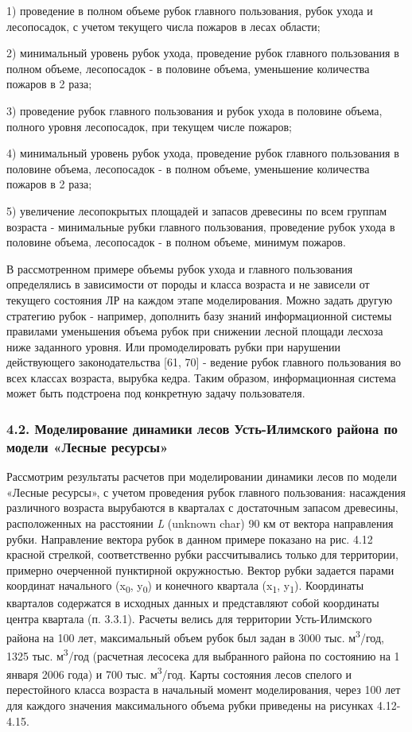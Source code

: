 \documentclass{article}
\begin{document}
1) проведение в полном объеме рубок главного 
пользования, рубок ухода и лесопосадок, с учетом 
текущего числа пожаров в лесах области; 

2) минимальный уровень рубок ухода, проведение 
рубок главного пользования в полном объеме, 
лесопосадок - в половине объема, уменьшение 
количества пожаров в 2 раза; 

3) проведение рубок главного пользования и рубок 
ухода в половине объема, полного уровня лесопосадок, 
при текущем числе пожаров; 

4) минимальный уровень рубок ухода, проведение 
рубок главного пользования в половине объема, 
лесопосадок - в полном объеме, уменьшение количества 
пожаров в 2 раза; 

5) увеличение лесопокрытых площадей и запасов 
древесины по всем группам возраста - минимальные 
рубки главного пользования, проведение рубок 
ухода в половине объема, лесопосадок - в полном 
объеме, минимум пожаров.

В рассмотренном примере объемы рубок ухода 
и главного пользования определялись в зависимости 
от породы и класса возраста и не зависели от 
текущего состояния ЛР на каждом этапе моделирования. 
Можно задать другую стратегию рубок - например, 
дополнить базу знаний информационной системы 
правилами уменьшения объема рубок при снижении 
лесной площади лесхоза ниже заданного уровня. 
Или промоделировать рубки при нарушении действующего 
законодательства [61, 70] - ведение рубок главного 
пользования во всех классах возраста, вырубка 
кедра. Таким образом, информационная система 
может быть подстроена под конкретную задачу 
пользователя.\label{HToc199746742}

\subsubsection*{\textbf{4.2. Моделирование динамики лесов 
Усть-Илимского района по модели «Лесные ресурсы»}}

Рассмотрим результаты расчетов при моделировании 
динамики лесов по модели «Лесные ресурсы», 
с учетом проведения рубок главного пользования: 
насаждения различного возраста вырубаются 
в кварталах с достаточным запасом древесины, 
расположенных на расстоянии \textit{L }(unknown char) 
90 км от вектора направления рубки. Направление 
вектора рубок в данном примере показано на 
рис. 4.12 красной стрелкой, соответственно рубки 
рассчитывались только для территории, примерно 
очерченной пунктирной окружностью. Вектор 
рубки задается парами координат начального 
(x\textsubscript{0}, y\textsubscript{0}) и конечного квартала 
(x\textsubscript{1}, y\textsubscript{1}). Координаты кварталов 
содержатся в исходных данных и представляют 
собой координаты центра квартала (п. 3.3.1). Расчеты 
велись для территории Усть-Илимского района 
на 100 лет, максимальный объем рубок был задан 
в 3000 тыс. м\textsuperscript{3}/год, 1325 тыс. м\textsuperscript{3}/год 
(расчетная лесосека для выбранного района по 
состоянию на 1 января 2006 года) и 700 тыс. м\textsuperscript{3}/год. 
Карты состояния лесов спелого и перестойного 
класса возраста в начальный момент моделирования, 
через 100 лет для каждого значения максимального 
объема рубки приведены на рисунках 4.12-4.15.
\end{document}
